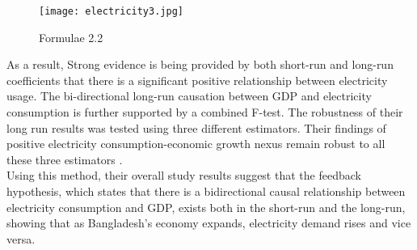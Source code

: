 \documentclass[conference]{IEEEtran}
\begin{document}
\begin{figure}[htbp]
    \centerline{\texttt{[image: electricity3.jpg]}}
    \caption{Formulae 2.2}
\end{figure}
As a result, Strong evidence is being provided by both short-run and long-run coefficients that there is a significant positive relationship between electricity usage.
The bi-directional long-run causation between GDP and electricity consumption is further supported by a combined F-test. The robustness of their long run results was tested using three different estimators.
Their findings of positive electricity consumption-economic growth nexus remain robust to all these three estimators .\\
Using this method, their overall study results suggest that the feedback hypothesis, which states that there is a bidirectional causal relationship between electricity
consumption and GDP, exists both in the short-run and the long-run, showing that as Bangladesh's economy expands, electricity demand rises and vice versa.
\end{document}
